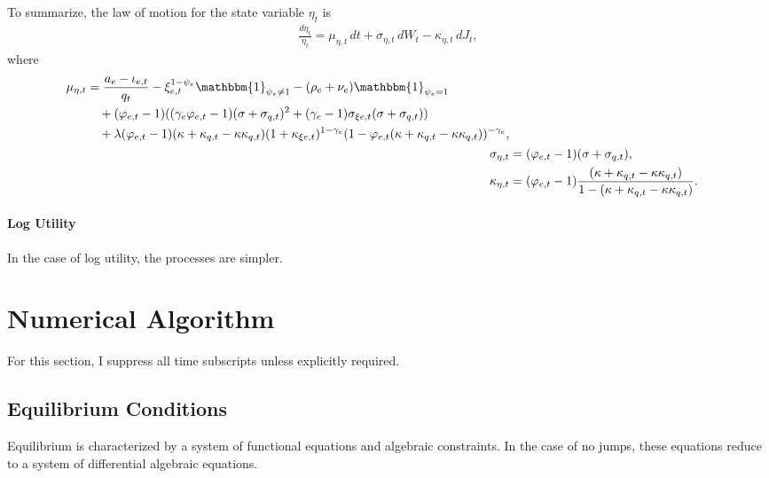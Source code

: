 \documentclass[12 pt, oneside]{article}
\theoremstyle{definition}
\theoremstyle{definition}
\theoremstyle{definition}
\begin{document}
To summarize, the law of motion for the state variable $\eta_t$ is
\begin{align}\label{eq:law of motion for eta}
\frac{d\eta_t}{\eta_t} = \mu_{\eta, t}\, dt + \sigma_{\eta, t}\, dW_t - \kappa_{\eta, t}\, dJ_t,
\end{align}
where
\begin{align}
\label{eq:drift of eta}  \begin{split}
  \mu_{\eta, t} & =  \frac{a_e - \iota_{e, t}}{q_t}- \xi_{e, t}^{1 - \psi_e}\mathbbm{1}_{\psi_e\neq 1} - (\rho_e + \nu_e)\mathbbm{1}_{\psi_e = 1} \\
              &\quad +  (\varphi_{e, t} - 1)((\gamma_e\varphi_{e, t} - 1)(\sigma + \sigma_{q, t})^2 + (\gamma_e - 1)\sigma_{\xi e, t}(\sigma + \sigma_{q, t}))\\
              &\quad + \lambda (\varphi_{e, t} - 1)(\kappa + \kappa_{q, t} - \kappa\kappa_{q, t})(1 + \kappa_{\xi e, t})^{1 - \gamma_e}(1 - \varphi_{e, t}(\kappa + \kappa_{q, t} - \kappa\kappa_{q, t}))^{ - \gamma_e},\\
  \end{split}\\
  \sigma_{\eta, t} & = (\varphi_{e, t} - 1)(\sigma + \sigma_{q, t}),\label{eq:volatility of eta}\\
  \kappa_{\eta, t} & = (\varphi_{e, t} - 1)\frac{(\kappa + \kappa_{q, t} - \kappa\kappa_{q, t})}{1 - (\kappa + \kappa_{q, t} - \kappa\kappa_{q, t})}\label{eq:jump size of eta}.
\end{align}

\paragraph{Log Utility}

In the case of log utility, the processes are simpler.


\section{Numerical Algorithm}
\label{sec:numerical}
For this section, I suppress all time subscripts unless explicitly required.

\subsection{Equilibrium Conditions}
Equilibrium is characterized by a system of functional equations and algebraic constraints. In the case of no jumps, these equations reduce to a system of differential algebraic equations.
\end{document}
